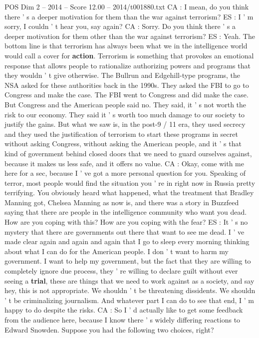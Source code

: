 \begin{textsample}{POS Dim 2 – 2014 – Score 12.00 – 2014/t001880.txt}
CA : I mean, do you think there ' s a deeper motivation for them than the war against terrorism?
ES : I ' m sorry, I couldn ' t hear you, say again?
CA : Sorry.
Do you think there ' s a deeper motivation for them other than the war against terrorism?
ES : Yeah.
The bottom line is that terrorism has always been what we in the intelligence world would call a cover for \textbf{action}.
Terrorism is something that provokes an emotional response that allows people to rationalize authorizing powers and programs that they wouldn ' t give otherwise.
The Bullrun and Edgehill-type programs, the NSA asked for these authorities back in the 1990s.
They asked the FBI to go to Congress and make the case.
The FBI went to Congress and did make the case.
But Congress and the American people said no.
They said, it ' s not worth the risk to our economy.
They said it ' s worth too much damage to our society to justify the gains.
But what we saw is, in the post-9 / 11 era, they used secrecy and they used the justification of terrorism to start these programs in secret without asking Congress, without asking the American people, and it ' s that kind of government behind closed doors that we need to guard ourselves against, because it makes us less safe, and it offers no value.
CA : Okay, come with me here for a sec, because I ' ve got a more personal question for you.
Speaking of terror, most people would find the situation you ' re in right now in Russia pretty terrifying.
You obviously heard what happened, what the treatment that Bradley Manning got, Chelsea Manning as now is, and there was a story in Buzzfeed saying that there are people in the intelligence community who want you dead.
How are you coping with this?
How are you coping with the fear?
ES : It ' s no mystery that there are governments out there that want to see me dead.
I ' ve made clear again and again and again that I go to sleep every morning thinking about what I can do for the American people.
I don ' t want to harm my government.
I want to help my government, but the fact that they are willing to completely ignore due process, they ' re willing to declare guilt without ever seeing a \textbf{trial}, these are things that we need to work against as a society, and say hey, this is not appropriate.
We shouldn ' t be threatening dissidents.
We shouldn ' t be criminalizing journalism.
And whatever part I can do to see that end, I ' m happy to do despite the risks.
CA : So I ' d actually like to get some feedback from the audience here, because I know there ' s widely differing reactions to Edward Snowden.
Suppose you had the following two choices, right?

\end{textsample}
